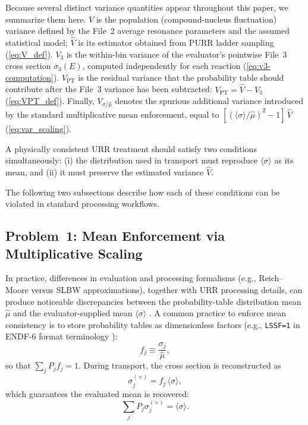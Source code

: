 \documentclass{style/nseJournal}
\newcommand{\sbin}{\langle \sigma \rangle}
\begin{document}
Because several distinct variance quantities appear throughout this paper, we summarize them here. $V$ is the population (compound-nucleus fluctuation) variance defined by the File~2 average resonance parameters and the assumed statistical model; $\hat{V}$ is its estimator obtained from PURR ladder sampling (\autoref{eq:V_def}). $V_3$ is the within-bin variance of the evaluator's pointwise File~3 cross section $\sigma_3(E)$, computed independently for each reaction (\autoref{eq:v3-computation}). $V_{\mathrm{PT}}$ is the residual variance that the probability table should contribute after the File~3 variance has been subtracted: $V_{\mathrm{PT}} = \hat{V} - V_3$ (\autoref{eq:VPT_def}). Finally, $V_{\sigma/\hat{\mu}}$ denotes the spurious additional variance introduced by the standard multiplicative mean enforcement, equal to $[(\sbin/\hat{\mu})^2 - 1]\,\hat{V}$ (\autoref{eq:var_scaling}).

A physically consistent URR treatment should satisfy two conditions simultaneously:
(i) the distribution used in transport must reproduce $\sbin$ as its mean, and
(ii) it must preserve the estimated variance $\hat{V}$.

The following two subsections describe how each of these conditions can be violated in standard processing workflows.

\subsection{Problem~1: Mean Enforcement via Multiplicative Scaling}
\label{ssec:lssf_flaw}

In practice, differences in evaluation and processing formalisms (e.g., Reich--Moore versus SLBW approximations), together with URR processing details, can produce noticeable discrepancies between the probability-table distribution mean $\hat{\mu}$ and the evaluator-supplied mean $\sbin$ \cite{Cullen2010ENDF,Sublet2009}. A common practice to enforce mean consistency is to store probability tables as dimensionless factors (e.g., \texttt{LSSF=1} in ENDF-6 format terminology \cite{endf-manual}):
\begin{equation}
f_j \equiv \frac{\sigma_j}{\hat{\mu}},
\label{eq:ptable-orig-factor}
\end{equation}
so that $\sum_j P_j f_j = 1$.
During transport, the cross section is reconstructed as
\begin{equation}
\sigma_j^{(\times)} = f_j\,\sbin,
\label{eq:sigma_times}
\end{equation}
which guarantees the evaluated mean is recovered:
\begin{equation}
\sum_j P_j \sigma_j^{(\times)} = \sbin.
\end{equation}
\end{document}
